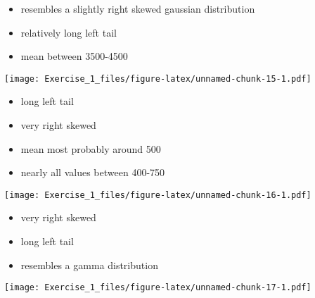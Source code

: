 \documentclass[]{article}
\newenvironment{Shaded}{\begin{snugshade}}{\end{snugshade}}
\newcommand{\CommentTok}[1]{\textcolor[rgb]{0.56,0.35,0.01}{\textit{#1}}}
\newcommand{\KeywordTok}[1]{\textcolor[rgb]{0.13,0.29,0.53}{\textbf{#1}}}
\newcommand{\NormalTok}[1]{#1}
\newcommand{\OperatorTok}[1]{\textcolor[rgb]{0.81,0.36,0.00}{\textbf{#1}}}
\providecommand{\tightlist}{%
  \setlength{\itemsep}{0pt}\setlength{\parskip}{0pt}}
\begin{document}
\begin{itemize}
\tightlist
\item
  resembles a slightly right skewed gaussian distribution
\item
  relatively long left tail
\item
  mean between 3500-4500
\end{itemize}

\begin{Shaded}
\end{Shaded}

\texttt{[image: Exercise\_1\_files/figure-latex/unnamed-chunk-15-1.pdf]}

\begin{itemize}
\tightlist
\item
  long left tail
\item
  very right skewed
\item
  mean most probably around 500
\item
  nearly all values between 400-750
\end{itemize}

\begin{Shaded}
\end{Shaded}

\texttt{[image: Exercise\_1\_files/figure-latex/unnamed-chunk-16-1.pdf]}

\begin{itemize}
\tightlist
\item
  very right skewed
\item
  long left tail
\item
  resembles a gamma distribution
\end{itemize}

\begin{Shaded}
\end{Shaded}

\texttt{[image: Exercise\_1\_files/figure-latex/unnamed-chunk-17-1.pdf]}
\end{document}
